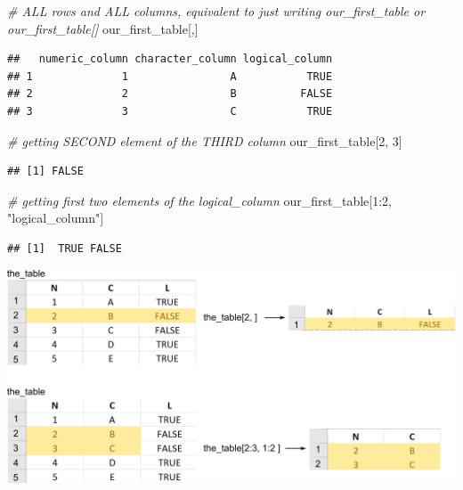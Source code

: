 \documentclass[
]{book}
\newenvironment{Shaded}{\begin{snugshade}}{\end{snugshade}}
\newcommand{\CommentTok}[1]{\textcolor[rgb]{0.56,0.35,0.01}{\textit{#1}}}
\newcommand{\DecValTok}[1]{\textcolor[rgb]{0.00,0.00,0.81}{#1}}
\newcommand{\NormalTok}[1]{#1}
\newcommand{\SpecialCharTok}[1]{\textcolor[rgb]{0.00,0.00,0.00}{#1}}
\newcommand{\StringTok}[1]{\textcolor[rgb]{0.31,0.60,0.02}{#1}}
\begin{document}
\begin{Shaded}
\begin{Highlighting}[]
\CommentTok{\# ALL rows and ALL columns, equivalent to just writing \textasciigrave{}our\_first\_table\textasciigrave{} or \textasciigrave{}our\_first\_table[]\textasciigrave{}}
\NormalTok{our\_first\_table[,]}
\end{Highlighting}
\end{Shaded}

\begin{verbatim}
##   numeric_column character_column logical_column
## 1              1                A           TRUE
## 2              2                B          FALSE
## 3              3                C           TRUE
\end{verbatim}

\begin{Shaded}
\begin{Highlighting}[]
\CommentTok{\# getting SECOND element of the THIRD column}
\NormalTok{our\_first\_table[}\DecValTok{2}\NormalTok{, }\DecValTok{3}\NormalTok{]}
\end{Highlighting}
\end{Shaded}

\begin{verbatim}
## [1] FALSE
\end{verbatim}

\begin{Shaded}
\begin{Highlighting}[]
\CommentTok{\# getting first two elements of the logical\_column}
\NormalTok{our\_first\_table[}\DecValTok{1}\SpecialCharTok{:}\DecValTok{2}\NormalTok{, }\StringTok{"logical\_column"}\NormalTok{]}
\end{Highlighting}
\end{Shaded}

\begin{verbatim}
## [1]  TRUE FALSE
\end{verbatim}

\begin{center}\includegraphics[width=1\linewidth]{images/table-rows-columns} \end{center}
\end{document}
